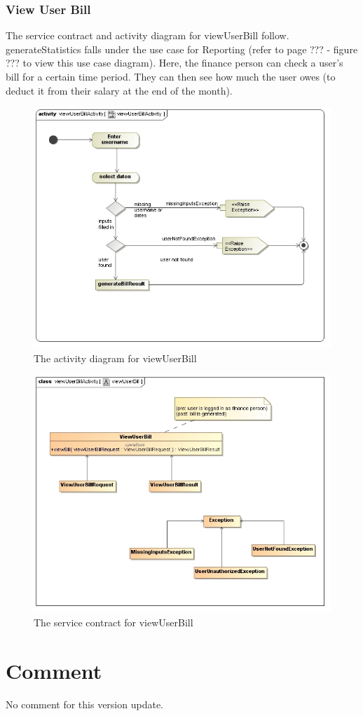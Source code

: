 \documentclass[a4paper,12pt]{report}
\begin{document}
\subsubsection{View User Bill }
The service contract and activity diagram for viewUserBill follow. generateStatistics falls under the use case for Reporting (refer to page ??? - figure ??? to view this use case diagram). Here, the finance person can check a user's bill for a certain time period. They can then see how much the user owes (to deduct it from their salary at the end of the month).

\begin{figure}[H]
  \centering
    \includegraphics[width=1.0\textwidth]{../images/viewUserBillActivity.jpg}
    \caption{The activity diagram for viewUserBill} 
\end{figure}
\begin{figure}[H]
  \centering
    \includegraphics[width=1.0\textwidth]{../images/viewUserBill.jpg}
    \caption{The service contract for viewUserBill} 
\end{figure}

\section{Comment}
No comment for this version update.
\end{document}
